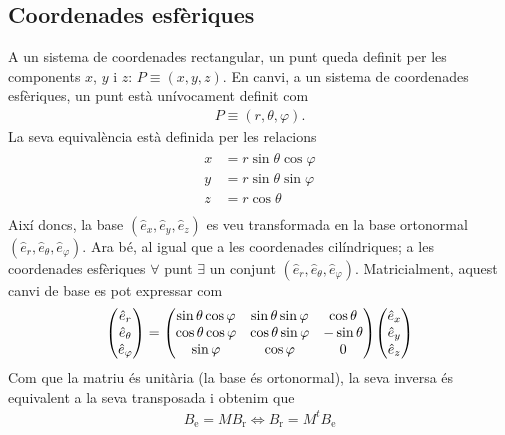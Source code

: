 \subsection{Coordenades esfèriques}
A un sistema de coordenades rectangular, un punt queda definit per les components $x$, $y$ i $z$: $P \equiv (x,y,z)$. En canvi, a un sistema de coordenades esfèriques, un punt està unívocament definit com
\begin{align}
	P \equiv (r, \theta, \varphi).
\end{align}
La seva equivalència està definida per les relacions
\begin{align}
	\begin{aligned}
		x & = r \sin \theta \cos \varphi \\
		y & = r \sin \theta \sin \varphi \\
		z & = r \cos \theta \\
	\end{aligned}
\end{align}
Així doncs, la base $(\hat{e}_{x}, \hat{e}_{y}, \hat{e}_{z})$ es veu transformada en la base ortonormal $(\hat{e}_{r}, \hat{e}_{\theta}, \hat{e}_{\varphi})$. Ara bé, al igual que a les coordenades cilíndriques; a les coordenades esfèriques $\forall$ punt $\exists$ un conjunt $(\hat{e}_{r}, \hat{e}_{\theta}, \hat{e}_{\varphi})$. Matricialment, aquest canvi de base es pot expressar com
\begin{align}
	\mqty( \hat{e}_{r} \\ \hat{e}_{\theta} \\ \hat{e}_{\varphi} ) = \mqty( \sin \theta \cos \varphi & \sin \theta \sin \varphi & \cos \theta \\ \cos \theta \cos \varphi & \cos \theta \sin \varphi & -\sin \theta \\ \sin \varphi & \cos \varphi & 0 ) \mqty( \hat{e}_{x} \\ \hat{e}_{y} \\ \hat{e}_{z} )
\end{align}
Com que la matriu és unitària (la base és ortonormal), la seva inversa és equivalent a la seva transposada i obtenim que
\begin{align*}
	B_{\text{e}} = M B_{\text{r}} \Leftrightarrow B_{\text{r}} = M^{t} B_{\text{e}}
\end{align*}

